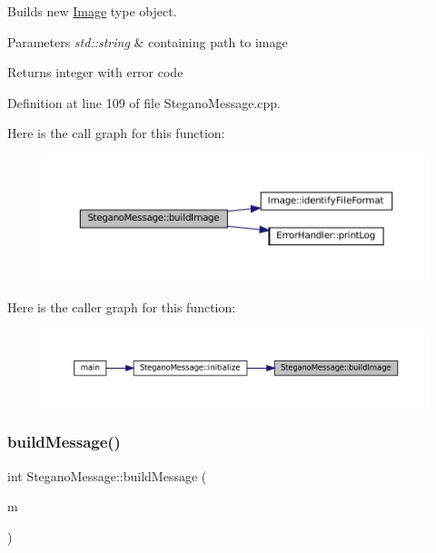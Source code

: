 Builds new \mbox{\hyperlink{classImage}{Image}} type object. 


\begin{DoxyParams}{Parameters}
{\em std\+::string} & containing path to image \\
\hline
\end{DoxyParams}
\begin{DoxyReturn}{Returns}
integer with error code 
\end{DoxyReturn}


Definition at line 109 of file Stegano\+Message.\+cpp.

Here is the call graph for this function\+:
\nopagebreak
\begin{figure}[H]
\begin{center}
\leavevmode
\includegraphics[width=350pt]{classSteganoMessage_ad90a4cf8cf03febfb4c3df955ccab13d_cgraph}
\end{center}
\end{figure}
Here is the caller graph for this function\+:
\nopagebreak
\begin{figure}[H]
\begin{center}
\leavevmode
\includegraphics[width=350pt]{classSteganoMessage_ad90a4cf8cf03febfb4c3df955ccab13d_icgraph}
\end{center}
\end{figure}
\mbox{\label{classSteganoMessage_a43a7d1579509a4004a86ad70dad10f65}} 
\subsubsection{\texorpdfstring{buildMessage()}{buildMessage()}}
{\footnotesize\ttfamily int Stegano\+Message\+::build\+Message (\begin{DoxyParamCaption}\item[{std\+::string}]{m }\end{DoxyParamCaption})}



